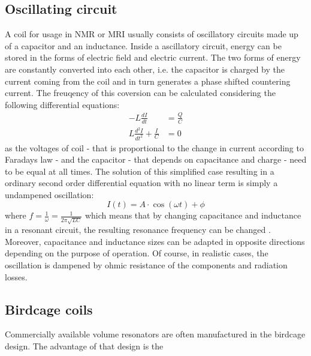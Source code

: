            \subsection{Oscillating circuit}
                A coil for usage in NMR or MRI usually consists of oscillatory circuits made up of a capacitor and an inductance. Inside a ascillatory circuit, energy can be stored in the forms of electric field and electric current. The two forms of energy are constantly converted into each other, i.e. the capacitor is charged by the current coming from the coil and in turn generates a phase shifted countering current. The freuqency of this coversion can be calculated considering the following differential equations:
                \begin{equation}
                    \begin{aligned}
                        -L\frac{dI}{dt} &= \frac{Q}{C} \\
                        L\frac{d^2I}{dt^2} + \frac{I}{C} &= 0
                    \end{aligned}
                \end{equation}
                as the voltages of coil - that is proportional to the change in current according to Faradays law - and the capacitor - that depends on capacitance and charge - need to be equal at all times. The solution of this simplified case resulting in a ordinary second order differential equation with no linear term is simply a undampened oscillation:
                \begin{equation}
                    I(t) =  A \cdot \cos(\omega t) + \phi 
                \end{equation}
                where $f= \frac{1}{\omega} = \frac{1}{2\pi\sqrt{LC}}$ which means that by changing capacitance and inductance in a resonant circuit, the resulting resonance frequency can be changed \cite{rao_electronic_2011}. Moreover, capacitance and inductance sizes can be adapted in opposite directions depending on the purpose of operation.
                Of course, in realistic cases, the oscillation is dampened by ohmic resistance of the components and radiation losses.
            \subsection{Birdcage coils}
            Commercially available volume resonators are often manufactured in the birdcage design. The advantage of that design is the 
